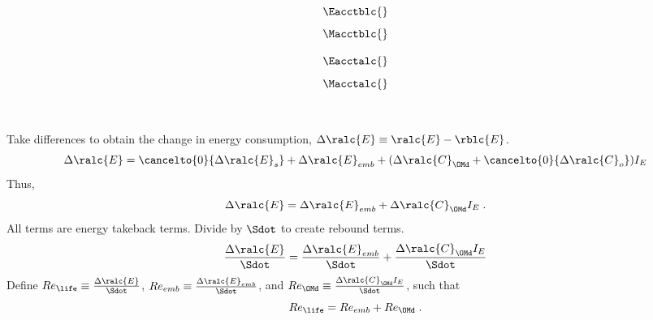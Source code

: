

\begin{landscape}

\linespread{1}


\sectionsep{}

{
\begin{equation}
  \Eacctblc{}
\end{equation}
}
{
\begin{equation}
  \Macctblc{}
\end{equation}
}

\sectionsep{}

{
\begin{equation}
  \Eacctalc{}
\end{equation}
}
{
\begin{equation}
  \Macctalc{}
\end{equation}
}

\sectionsep{}

\derivsection{}
{
~
    
Take differences to obtain the change in energy consumption, $\Delta \ralc{E} \equiv \ralc{E} - \rblc{E}$.
%
\begin{equation}
  \Delta \ralc{E} = \cancelto{0}{\Delta \ralc{E}_s}
                    + \Delta \ralc{E}_{emb}
                    + (\Delta \ralc{C}_{\OMd} + \cancelto{0}{\Delta \ralc{C}_o}) I_E
\end{equation}
%
Thus, 
%
\begin{equation}
  \Delta \ralc{E} = \Delta \ralc{E}_{emb} + \Delta \ralc{C}_{\OMd} I_E \; .
\end{equation}
%
All terms are energy takeback terms.
Divide by $\Sdot$
to create rebound terms.
%
\begin{equation}
  \frac{\Delta \ralc{E}}{\Sdot} = \frac{\Delta \ralc{E}_{emb}}{\Sdot} + \frac{\Delta \ralc{C}_{\OMd} I_E}{\Sdot}
\end{equation}
%
Define
$Re_{\life} \equiv \frac{\Delta \ralc{E}}{\Sdot}$, 
$Re_{emb} \equiv \frac{\Delta \ralc{E}_{emb}}{\Sdot}$, and
$Re_{\OMd} \equiv \frac{\Delta \ralc{C}_{\OMd} I_E}{\Sdot}$,
such that
%
\begin{equation}
  Re_{\life} = Re_{emb} + Re_{\OMd} \; .
\end{equation}
%
}
{
~

}
\end{landscape}
